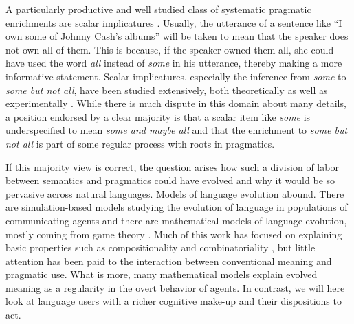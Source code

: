 \documentclass[a4paper, 11pt]{article}
\begin{document}
A particularly productive and well studied class of systematic pragmatic enrichments are scalar
implicatures
\citep{horn:1984,Hirschberg1985:A-Theory-of-Sca,LevinsonPragmatics1983,Geurts2010:Quantity-Implic}. Usually,
the utterance of a sentence like ``I own some of Johnny Cash's albums'' will be taken to mean
that the speaker does not own all of them. This is because, if the speaker owned them all, she
could have used the word \emph{all} instead of \emph{some} in his utterance, thereby making a
more informative statement. Scalar implicatures, especially the inference from \emph{some} to
\emph{some but not all}, have been studied extensively, both theoretically
\citep[e.g.,][]{Sauerland2004:Scalar-Implicat,ChierchiaFox2008:The-Grammatical,Rooyvan-RooijJagerde-Jager2012:Explaining-Quan}
as well as experimentally
\citep[e.g.,][]{BottNoveck2004:Some-Utterances,huang+snedeker:2009,GrodnerKlein2010:Some-and-Possib,GoodmanStuhlmuller2013:Knowledge-and-I,DegenTanenhaus2012:Processing-Scal}. While
there is much dispute in this domain about many details, a position endorsed by a clear
majority is that a scalar item like \emph{some} is underspecified to mean \emph{some and maybe
  all} and that the enrichment to \emph{some but not all} is part of some regular process with
roots in pragmatics.

If this majority view is correct, the question arises how such a division of labor between
semantics and pragmatics could have evolved and why it would be so pervasive across natural
languages. Models of language evolution abound. There are simulation-based models studying the
evolution of language in populations of communicating agents
\citep{Hurford1989:Biological-Evol,Steels1995:A-Self-Organizi,LenaertsJansen2005:The-Evolutionar,SteelsBelpaeme2005:Coordinating-Pe,BaronchelliPuglisi2008:Cultural-route-,steels:2011,SpikeStadler2016:Minimal-Require}
and there are mathematical models of language evolution, mostly coming from game theory
\citep{lewis:1969,Warneryd1993:Cheap-Talk-Coor,BlumeKim1993:Evolutionary-St,nowak+krakauer:1999,Huttegger2007:Evolution-and-t,Skyrms2010:Signals}. Much
of this work has focused on explaining basic properties such as compositionality and
combinatoriality
\citep[e.g.,][]{Batali1998:Computational-S,nowak+krakauer:1999,nowak+etal:2000,KirbyHurford2002:The-Emergence-o,kirby:2002,SmithKirby2003:Iterated-Learni,Gong2007:Language-Evolut,kirby+etal:2015,verhoef+etal:2014,Franke2015:Proto-Syntax},
but little attention has been paid to the interaction between conventional meaning and
pragmatic use. What is more, many mathematical models explain evolved meaning as a regularity
in the overt behavior of agents. In contrast, we will here look at language users with a richer
cognitive make-up and their dispositions to act.
\end{document}
